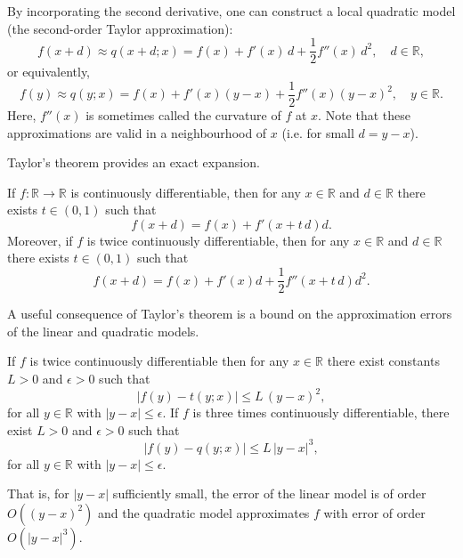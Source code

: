 \documentclass[9pt, headings=standardclasses, parskip=half]{scrartcl}
\renewcommand{\emph}[1]{\textcolor{mypurple}{#1}}
\begin{document}
By incorporating the second derivative, one can construct a local quadratic model (the second-order Taylor approximation):
\begin{equation}
f(x+d)\approx q(x+d;x)=f(x)+f'(x)\,d+\frac{1}{2}f''(x)\,d^2,\quad d\in\mathbb{R},
\end{equation}
or equivalently,
\begin{equation}\label{eq:second_order_taylor_approximation_univariate}
f(y)\approx q(y;x)=f(x)+f'(x)(y-x)+\frac{1}{2}f''(x)(y-x)^2,\quad y\in\mathbb{R}.
\end{equation}
Here, \(f''(x)\) is sometimes called the \emph{curvature} of \(f\) at \(x\). Note that these approximations are valid in a neighbourhood of \(x\) (i.e. for small \(d=y-x\)).

Taylor's theorem provides an exact expansion. 

\begin{theorem}
\label{thm:univariate_taylor_expansion}
If \(f:\mathbb{R}\to\mathbb{R}\) is continuously differentiable, then for any \(x\in\mathbb{R}\) and \(d\in\mathbb{R}\) there exists \(t\in (0,1)\) such that
\[
f(x+d)=f(x)+f'\left(x+t\,d\right)d.
\]
Moreover, if \(f\) is twice continuously differentiable, then for any \(x\in\mathbb{R}\) and \(d\in\mathbb{R}\) there exists \(t\in (0,1)\) such that
\[
f(x+d)=f(x)+f'(x)d+\frac{1}{2}f''\left(x+t\,d\right)d^2.
\]
\end{theorem}

A useful consequence of Taylor's theorem is a bound on the approximation errors of the linear and quadratic models.

\begin{corollary}
\label{cor:approximation_error_univariate_taylor}  
If \(f\) is twice continuously differentiable then for any \(x\in\mathbb{R}\) there exist constants \(L>0\) and \(\epsilon>0\) such that
\[
\left|f(y)-t(y;x)\right|\le L\,(y-x)^2,
\]
for all \(y\in\mathbb{R}\) with \(|y-x|\le\epsilon\). If \(f\) is three times continuously differentiable, there exist \(L>0\) and \(\epsilon>0\) such that
\[
\left|f(y)-q(y;x)\right|\le L\,|y-x|^3,
\]
for all \(y\in\mathbb{R}\) with \(|y-x|\le\epsilon\).
\end{corollary}

That is, for \(|y-x|\) sufficiently small, the error of the linear model is of order \(O\left((y-x)^2\right)\) and the quadratic model approximates \(f\) with error of order \(O\left(|y-x|^3\right)\).
\end{document}
